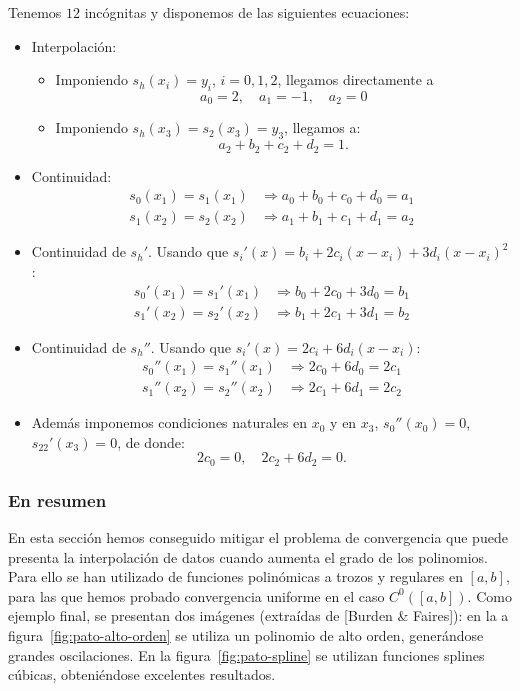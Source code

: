     Tenemos $12$ incógnitas y disponemos de las siguientes ecuaciones:
    \begin{itemize}
    \item Interpolación:
      \begin{itemize}
      \item Imponiendo $s_h(x_i)=y_i$, $i=0,1,2$, llegamos directamente
        a
        \begin{equation*}
          a_0=2, \quad a_1=-1, \quad a_2=0
        \end{equation*}
      \item Imponiendo $s_h(x_3)=s_2(x_3)=y_3$, llegamos a:
        \begin{equation*}
          a_2+b_2+c_2+d_2=1.
        \end{equation*}
      \end{itemize}
    \item Continuidad:
      \begin{align*}
       s_0(x_1)=s_1(x_1) &\Rightarrow a_0+b_0+c_0+d_0 = a_1
       \\
       s_1(x_2)=s_2(x_2) &\Rightarrow a_1+b_1+c_1+d_1 = a_2
      \end{align*}
    \item Continuidad de $s_h'$. Usando que
      $s_i'(x)=b_i+2c_i(x-x_i)+3d_i(x-x_i)^2$:
      \begin{align*}
       s_0'(x_1)=s_1'(x_1) &\Rightarrow b_0+2c_0+3d_0 = b_1
       \\
       s_1'(x_2)=s_2'(x_2) &\Rightarrow b_1+2c_1+3d_1 = b_2
      \end{align*}
    \item Continuidad de $s_h''$. Usando que
      $s_i'(x)=2c_i+6d_i(x-x_i)$:
      \begin{align*}
       s_0''(x_1)=s_1''(x_1) &\Rightarrow 2c_0+6d_0 = 2c_1
       \\
       s_1''(x_2)=s_2''(x_2) &\Rightarrow 2c_1+6d_1 = 2c_2
      \end{align*}
    \item Además imponemos condiciones naturales en $x_0$ y en $x_3$,
      $s_0''(x_0)=0$, $s_22'(x_3)=0$, de donde:
      \begin{equation*}
       2c_0 = 0, \quad 2c_2 + 6 d_2 =0.
      \end{equation*}
    \end{itemize}

    \subsubsection*{En resumen}
    En esta sección hemos conseguido mitigar el problema de convergencia
    que puede presenta la interpolación de datos cuando aumenta el grado
    de los polinomios. Para ello se han utilizado de funciones polinómicas
    a trozos y regulares en $[a,b]$, para las que hemos probado
    convergencia uniforme en el caso $C^0([a,b])$. Como ejemplo final, se
    presentan dos imágenes (extraídas de [Burden \& Faires]): en la a
    figura~\ref{fig:pato-alto-orden} se utiliza un polinomio de alto
    orden, generándose grandes oscilaciones. En la
    figura~\ref{fig:pato-spline} se utilizan funciones splines cúbicas,
    obteniéndose excelentes resultados.

